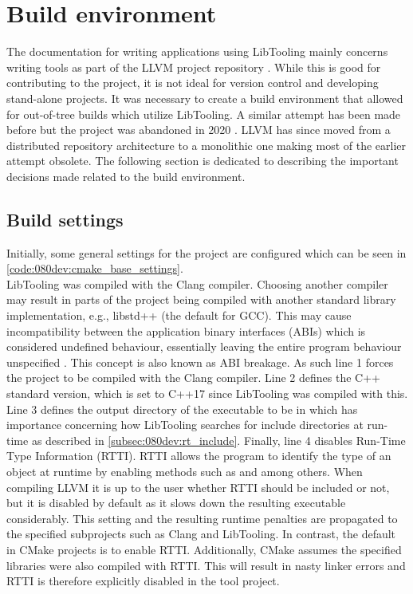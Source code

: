 \section{Build environment} \label{sec:080dev:build_env}

The documentation for writing applications using LibTooling mainly concerns writing tools as part of the LLVM project repository \cite{clangMatchingClangAST, clangClangTransformerTutorial}. While this is good for contributing to the project, it is not ideal for version control and developing stand-alone projects.
It was necessary to create a build environment that allowed for out-of-tree builds which utilize LibTooling. A similar attempt has been made before but the project was abandoned in 2020 \cite{kasmisClangOutoftreeBuild2023}. LLVM has since moved from a distributed repository architecture to a monolithic one making most of the earlier attempt obsolete.
The following section is dedicated to describing the important decisions made related to the build environment.

\subsection{Build settings}

Initially, some general settings for the project are configured which can be seen in \cref{code:080dev:cmake_base_settings}.\\
LibTooling was compiled with the Clang compiler.
Choosing another compiler may result in parts of the project being compiled with another standard library implementation, e.g., libstd++ (the default for GCC). This may cause incompatibility between the application binary interfaces (ABIs) which is considered undefined behaviour, essentially leaving the entire program behaviour unspecified \cite{cppreferenceUndefinedBehaviorCppreference}. This concept is also known as ABI breakage.
As such line 1 forces the project to be compiled with the Clang compiler.
Line 2 defines the C++ standard version, which is set to C++17 since LibTooling was compiled with this.
Line 3 defines the output directory of the executable to be in  which has importance concerning how LibTooling searches for include directories at run-time as described in \cref{subsec:080dev:rt_include}.
Finally, line 4 disables Run-Time Type Information (RTTI). RTTI allows the program to identify the type of an object at runtime by enabling methods such as  and  among others. When compiling LLVM it is up to the user whether RTTI should be included or not, but it is disabled by default as it slows down the resulting executable considerably. This setting and the resulting runtime penalties are propagated to the specified subprojects such as Clang and LibTooling. In contrast, the default in CMake projects is to enable RTTI. Additionally, CMake assumes the specified libraries were also compiled with RTTI. This will result in nasty linker errors and RTTI is therefore explicitly disabled in the tool project.

